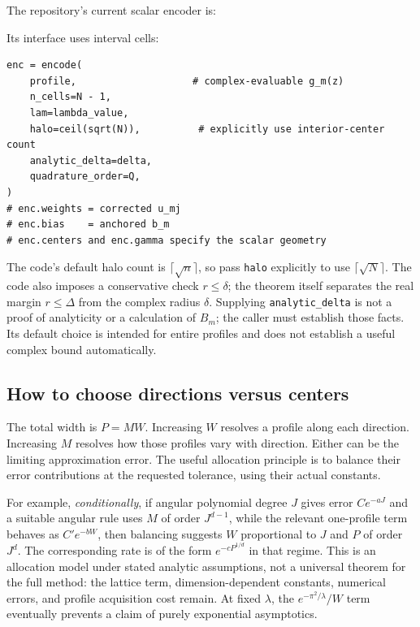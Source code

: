 \documentclass[11pt]{article}
\begin{document}
The repository's current scalar encoder is:
\begin{quote}
\end{quote}
Its interface uses interval cells:
\begin{verbatim}
enc = encode(
    profile,                    # complex-evaluable g_m(z)
    n_cells=N - 1,
    lam=lambda_value,
    halo=ceil(sqrt(N)),          # explicitly use interior-center count
    analytic_delta=delta,
    quadrature_order=Q,
)
# enc.weights = corrected u_mj
# enc.bias    = anchored b_m
# enc.centers and enc.gamma specify the scalar geometry
\end{verbatim}
The code's default halo count is $\lceil\sqrt{n}\rceil$, so pass \texttt{halo} explicitly to use $\lceil\sqrt N\rceil$. The code also imposes a conservative check $r\le\delta$; the theorem itself separates the real margin $r\le\Delta$ from the complex radius $\delta$. Supplying \texttt{analytic\_delta} is not a proof of analyticity or a calculation of $B_m$; the caller must establish those facts. Its default choice is intended for entire profiles and does not establish a useful complex bound automatically.

\subsection{How to choose directions versus centers}

The total width is $P=MW$. Increasing $W$ resolves a profile along each direction. Increasing $M$ resolves how those profiles vary with direction. Either can be the limiting approximation error. The useful allocation principle is to balance their error contributions at the requested tolerance, using their actual constants.

For example, \emph{conditionally}, if angular polynomial degree $J$ gives error $Ce^{-aJ}$ and a suitable angular rule uses $M$ of order $J^{d-1}$, while the relevant one-profile term behaves as $C'e^{-bW}$, then balancing suggests $W$ proportional to $J$ and $P$ of order $J^d$. The corresponding rate is of the form $e^{-cP^{1/d}}$ in that regime. This is an allocation model under stated analytic assumptions, not a universal theorem for the full method: the lattice term, dimension-dependent constants, numerical errors, and profile acquisition cost remain. At fixed $\lambda$, the $e^{-\pi^2/\lambda}/W$ term eventually prevents a claim of purely exponential asymptotics.
\end{document}
